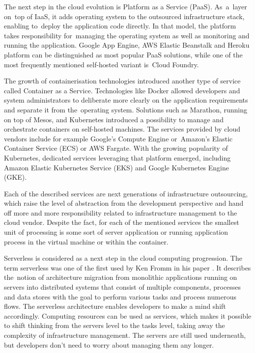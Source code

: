 The next step in the cloud evolution is Platform as a Service (PaaS). As~a~layer on~top of IaaS, it adds operating system to the outsourced infrastructure stack, enabling to~deploy the application code directly. In that model, the platform takes responsibility for~managing the operating system as well as monitoring and running the application. Google App Engine, AWS Elastic Beanstalk and Heroku platform can be distinguished as most popular PaaS solutions, while one of the most frequently mentioned self-hosted variant is~Cloud Foundry.

The growth of containerisation technologies introduced another type of service called Container as a Service. Technologies like Docker allowed developers and system administrators to deliberate more clearly on the application requirements and separate it from the~operating system. Solutions such as Marathon, running on top of Mesos, and Kubernetes introduced a possibility to manage and orchestrate containers on self-hosted machines. The services provided by cloud vendors include for example Google's Compute Engine or~Amazon's Elastic Container Service (ECS) or AWS Fargate. With the growing popularity of Kubernetes, dedicated services leveraging that platform emerged, including Amazon Elastic Kubernetes Service (EKS) and Google Kubernetes Engine (GKE).

Each of the described services are next generations of infrastructure outsourcing, which raise the level of abstraction from the development perspective and hand off more and more responsibility related to infrastructure management to the cloud vendor. Despite the fact, for each of the mentioned services the smallest unit of processing is some sort of server application or running application process in the virtual machine or within the container.

Serverless is considered as a next step in the cloud computing progression. The term serverless was one of the first used by Ken Fromm in his paper \cite{KenFromm}. It describes the~notion of architecture migration from monolithic applications running on servers into distributed systems that consist of multiple components, processes and data stores with the goal to perform various tasks and process numerous flows. The serverless architecture enables developers to make a mind shift accordingly. Computing resources can be used as services, which makes it possible to shift thinking from the servers level to the tasks level, taking away the complexity of infrastructure management. The servers are still used underneath, but developers don't need to worry about managing them any longer.

